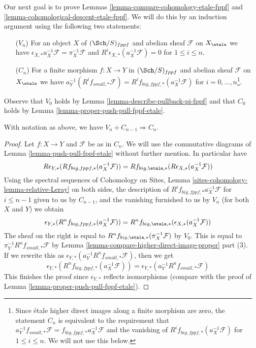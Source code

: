 \noindent
Our next goal is to prove Lemmas \ref{lemma-compare-cohomology-etale-fppf} and
\ref{lemma-cohomological-descent-etale-fppf}. We will do this by an induction
argument using the following two statements:
\begin{enumerate}
\item[($V_n$)] For an object $X$ of $(\Sch/S)_{fppf}$ and
abelian sheaf $\mathcal{F}$ on $X_\etale$ we have
$\epsilon_{X, *}a_X^{-1}\mathcal{F} = \pi_X^{-1}\mathcal{F}$ and
$R^i\epsilon_{X, *}(a_X^{-1}\mathcal{F}) = 0$
for $1 \leq i \leq n$.
\item[($C_n$)] For a finite morphism $f : X \to Y$ in $(\Sch/S)_{fppf}$
and abelian sheaf $\mathcal{F}$ on $X_\etale$ we have
$a_Y^{-1}(R^if_{small, *}\mathcal{F}) =
R^if_{big, fppf, *}(a_X^{-1}\mathcal{F})$
for $i = 0, \ldots, n$\footnote{Since \'etale higher direct images along
a finite morphism are zero, the statement $C_n$ is equivalent to the
requirement that
$a_Y^{-1}f_{small, *}\mathcal{F} = f_{big, fppf, *}a_X^{-1}\mathcal{F}$
and the vanishing of $R^if_{big, fppf, *}(a_X^{-1}\mathcal{F})$ for
$1 \leq i \leq n$. We will not use this below.}.
\end{enumerate}
Observe that $V_0$ holds by Lemma \ref{lemma-describe-pullback-pi-fppf}
and that $C_0$ holds by
Lemma \ref{lemma-proper-push-pull-fppf-etale}.

\begin{lemma}
\label{lemma-V-implies-C-etale-fppf}
With notation as above, we have $V_n + C_{n - 1} \Rightarrow C_n$.
\end{lemma}

\begin{proof}
Let $f : X \to Y$ and $\mathcal{F}$ be as in $C_n$.
We will use the commutative diagrams of
Lemma \ref{lemma-push-pull-fppf-etale}
without further mention. In particular have
$$
R\epsilon_{Y, *}(Rf_{big, fppf, *}(a_X^{-1}\mathcal{F})) =
Rf_{big, \etale, *}(R\epsilon_{X, *}(a_X^{-1}\mathcal{F}))
$$
Using the spectral sequences of
Cohomology on Sites, Lemma \ref{sites-cohomology-lemma-relative-Leray}
on both sides, the description of $R^if_{big, fppf, *}a_X^{-1}\mathcal{F}$
for $i \leq n - 1$ given to us by $C_{n - 1}$, and
the vanishing furnished to us by $V_n$
(for both $X$ and $Y$) we obtain 
$$
\epsilon_{Y, *}(R^nf_{big, fppf, *}(a_X^{-1}\mathcal{F})) =
R^nf_{big, \etale, *}(\epsilon_{X, *}(a_X^{-1}\mathcal{F}))
$$
The sheaf on the right is equal to
$R^nf_{big, \etale, *}(\pi_X^{-1}\mathcal{F})$ by $V_0$.
This is equal to $\pi_Y^{-1} R^nf_{small, *}\mathcal{F}$
by Lemma \ref{lemma-compare-higher-direct-image-proper} part (3).
If we rewrite this as
$\epsilon_{Y, *}(a_Y^{-1}R^nf_{small, *}\mathcal{F})$, then we get
$$
\epsilon_{Y, *}(R^nf_{big, fppf, *}(a_X^{-1}\mathcal{F})) =
\epsilon_{Y, *}(a_Y^{-1}R^nf_{small, *}\mathcal{F})
$$
This finishes the proof since $\epsilon_{Y, *}$ reflects
isomorphisms (compare with the
proof of Lemma \ref{lemma-proper-push-pull-fppf-etale}).
\end{proof}

